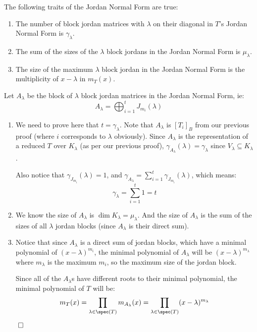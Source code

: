 \documentclass[10pt]{article}
\begin{document}
\begin{theorem}{The following traits of the Jordan Normal Form are true:
\begin{enumerate}
    \item The number of block jordan matrices with $\lambda$ on their diagonal in $T$'s Jordan Normal Form is $\gamma_\lambda$.
    \item The sum of the sizes of the $\lambda$ block jordans in the Jordan Normal Form is $\mu_\lambda$.
    \item The size of the maximum $\lambda$ block jordan in the Jordan Normal Form is the multiplicity of $x-\lambda$ in $m_T(x)$.
\end{enumerate}}

Let $A_\lambda$ be the block of $\lambda$ block jordan matrices in the Jordan Normal Form, ie:
 \[A_\lambda = \bigoplus_{i=1}^t J_{m_i}(\lambda) \]

\begin{enumerate}
    \item We need to prove here that $t=\gamma_\lambda$. Note that $A_\lambda$ is $[T_i]_B$ from our previous proof (where $i$ corresponds to $\lambda$ obviously). Since $A_\lambda$ is the representation of a reduced $T$ over $K_\lambda$ (as per our previous proof), $\gamma_{A_\lambda}(\lambda)=\gamma_\lambda$ since $V_\lambda\subseteq K_\lambda$.
    
    Also notice that $\gamma_{J_{m_i}}(\lambda)=1$, and $\gamma_{A_\lambda}=\sum_{i=1}^t \gamma_{J_{m_i}}(\lambda)$, which means:
    \[ \gamma_\lambda = \sum_{i=1}^t 1 = t \]
    
    \item We know the size of $A_\lambda$ is $\dim K_\lambda=\mu_\lambda$. And the size of $A_\lambda$ is the sum of the sizes of all $\lambda$ jordan blocks (since $A_\lambda$ is their direct sum).
    
    \item Notice that since $A_\lambda$ is a direct sum of jordan blocks, which have a minimal polynomial of $(x-\lambda)^{m_i}$, the minimal polynomial of $A_\lambda$ will be $(x-\lambda)^{m_\lambda}$ where $m_\lambda$ is the maximum $m_i$, so the maximum size of the jordan block.
    
    Since all of the $A_\lambda$s have different roots to their minimal polynomial, the minimal polynomial of $T$ will be:
    \[ m_T(x) = \prod_{\lambda\in\spec(T)} m_{A_\lambda}(x) = \prod_{\lambda\in\spec(T)} (x-\lambda)^{m_\lambda} \]
\end{enumerate}

$\qed$

\end{theorem}
\end{document}
